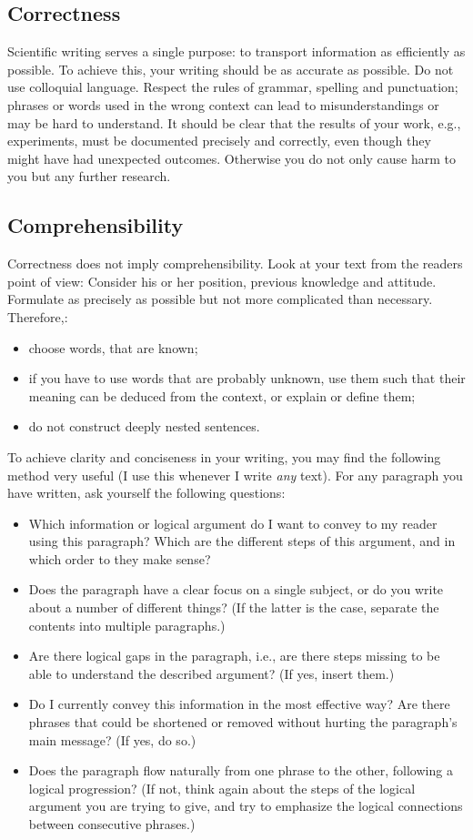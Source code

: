 \subsection{Correctness}
Scientific writing serves a single purpose: to transport information as efficiently as possible.
To achieve this, your writing should be as accurate as possible. 
Do not use colloquial language.
Respect the rules of grammar, spelling and punctuation; phrases or words used in the wrong context can lead to misunderstandings or may be hard to understand.
It should be clear that the results of your work, e.g., experiments, must be documented precisely and correctly, even though they might have had unexpected outcomes.
Otherwise you do not only cause harm to you but any further research.


\subsection{Comprehensibility}
Correctness does not imply comprehensibility.
Look at your text from the readers point of view: Consider his or her position, previous knowledge and attitude. Formulate as precisely as possible but not more complicated than necessary. 
Therefore,:
\begin{itemize}
    \item choose words, that are known;
    \item if you have to use words that are probably unknown, use them such that their meaning can be deduced from the context, or explain or define them;
    \item do not construct deeply nested sentences.
\end{itemize}

To achieve clarity and conciseness in your writing, you may find the following method very useful (I use this whenever I write \emph{any} text).
For any paragraph you have written, ask yourself the following questions:
\begin{itemize}
	\item Which information or logical argument do I want to convey to my reader using this paragraph? Which are the different steps of this argument, and in which order to they make sense?
	\item Does the paragraph have a clear focus on a single subject, or do you write about a number of different things? (If the latter is the case, separate the contents into multiple paragraphs.)	
	\item Are there logical \glqq gaps\grqq{} in the paragraph, i.e., are there steps missing to be able to understand the described argument? (If yes, insert them.)	
	\item Do I currently convey this information in the most effective way? Are there phrases that could be shortened or removed without hurting the paragraph's main message? (If yes, do so.)
	\item Does the paragraph \glqq flow\grqq{} naturally from one phrase to the other, following a logical progression? (If not, think again about the steps of the logical argument you are trying to give, and try to emphasize the logical connections between consecutive phrases.)
\end{itemize}

